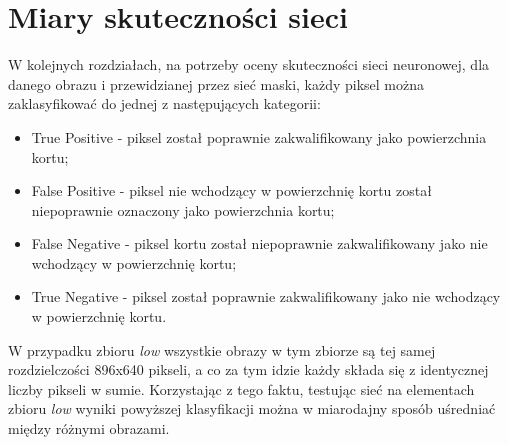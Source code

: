 \section{Miary skuteczności sieci}

W kolejnych rozdziałach, na potrzeby oceny skuteczności sieci neuronowej, dla danego obrazu i przewidzianej przez sieć maski, każdy piksel można zaklasyfikować do jednej z następujących kategorii:

\begin{itemize}
  \item True Positive - piksel został poprawnie zakwalifikowany jako powierzchnia kortu;
  \item False Positive - piksel nie wchodzący w powierzchnię kortu został niepoprawnie oznaczony jako powierzchnia kortu;
  \item False Negative - piksel kortu został niepoprawnie zakwalifikowany jako nie wchodzący w powierzchnię kortu;
  \item True Negative - piksel został poprawnie zakwalifikowany jako nie wchodzący w powierzchnię kortu.
\end{itemize}

W przypadku zbioru \textit{low} wszystkie obrazy w tym zbiorze są tej samej rozdzielczości 896x640 pikseli, a co za tym idzie każdy składa się z identycznej liczby pikseli w sumie.
Korzystając z tego faktu, testując sieć na elementach zbioru \textit{low} wyniki powyższej klasyfikacji można w miarodajny sposób uśredniać między różnymi obrazami.

